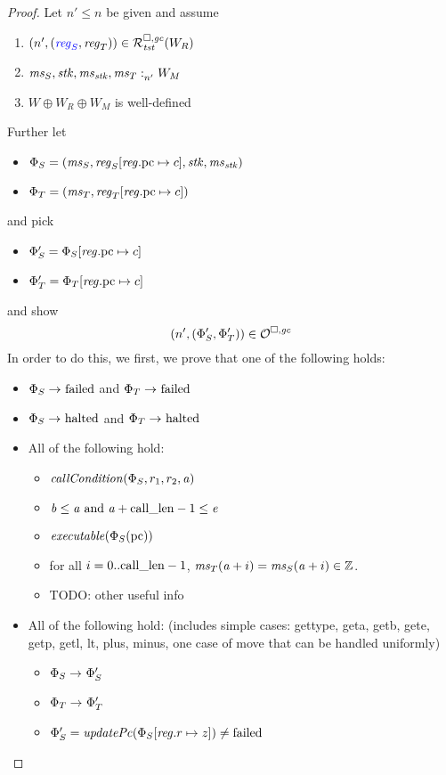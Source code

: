 \documentclass[a4paper]{article}
\begin{document}
\begin{proof}
Let $n' \leq n$ be given and assume
\begin{enumerate}
\item $\npair[n']{\stpair{\reg}{\reg}} \in \lrrg{\trust}(W_R)$ \label{item:reg-ass}
\item $\memSat[n']{\ms_S,\stk,\ms_\stk,\ms_T}{W_M}$\label{item:mem-ass}
\item $W \oplus W_R \oplus W_M$ is well-defined\label{item:worlds-def}
\end{enumerate}
Further let
\begin{itemize}
\item $\Phi_S = (\ms_S,\reg_S\updReg{\pcreg}{c},\stk,\ms_\stk)$
\item $\Phi_T = (\ms_T,\reg_T\updReg{\pcreg}{c})$
\end{itemize}
and pick
\begin{itemize}
\item $\Phi_S' = \Phi_S\updReg{\pcreg}{c}$
\item $\Phi_T' = \Phi_T\updReg{\pcreg}{c}$
\end{itemize}
and show
\[
  \npair[n']{(\Phi_S',\Phi_T')} \in \lro
\]
In order to do this, we first, we prove that one of the following holds:
\begin{itemize}
\item $\Phi_S \step \failed$ and $\Phi_T \step\failed$
\item $\Phi_S \step \halted$ and $\Phi_T \step\halted$
\item All of the following hold:
  \begin{itemize}
  \item $\callCond{\Phi_S,r_1,r_2,\aaddr}$
  \item $\baddr \leq \aaddr \tand \aaddr + \calllen-1 \leq \eaddr$
  \item $\exec{\Phi_S(\pcreg)}$
  \item for all $i = 0..\calllen-1$, $\ms_T(\aaddr+i) = \ms_S(\aaddr+i) \in \ints$.
  \item TODO: other useful info
  \end{itemize}
\item All of the following hold: (includes simple cases: gettype, geta, getb,
  gete, getp, getl, lt, plus, minus, one case of move that can be handled uniformly)
  \begin{itemize}
  \item $\Phi_S \step \Phi_S'$
  \item $\Phi_T \step \Phi_T'$
  \item $\Phi_S' = \updPcAddr{\Phi_S\updReg{r}{z}} \neq \failed$

\end{itemize}
\end{itemize}
\end{proof}
\end{document}
